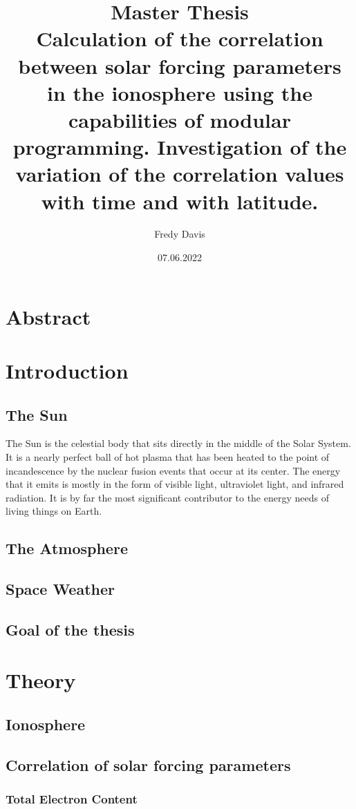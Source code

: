 \documentclass[a4paper, 12pt, nocenter]{thesis}
\title{Master Thesis\\
{\Large Calculation of the correlation between solar forcing parameters in the ionosphere using the capabilities of modular programming. Investigation of the variation of the correlation values with time and with latitude.}}
\date{07.06.2022}
\author{Fredy Davis}
\begin{document}
	
	
	

  	\maketitle
  	\newpage
  	\tableofcontents
  	\newpage
	\chapter*{Abstract}
	\newpage
	\chapter{Introduction}
		\section{The Sun}
		The Sun is the celestial body that sits directly in the middle of the Solar System. It is a nearly perfect ball of hot plasma that has been heated to the point of incandescence by the nuclear fusion events that occur at its center. The energy that it emits is mostly in the form of visible light, ultraviolet light, and infrared radiation. It is by far the most significant contributor to the energy needs of living things on Earth.\citep{stix2012the}
		\section{The Atmosphere}
		\section{Space Weather}
		\section{Goal of the thesis}
	\newpage
	\chapter{Theory}
		\section{Ionosphere}
		\section{Correlation of solar forcing parameters}
			\subsection{Total Electron Content}
\end{document}
